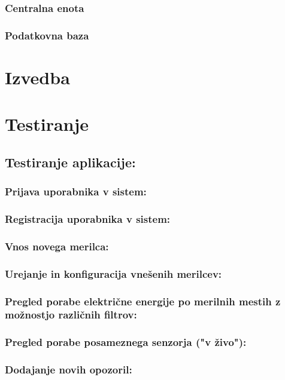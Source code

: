 \documentclass[12pt,a4paper,titlepage,openany]{report}
\begin{document}
\subsection{Centralna enota}

\subsection{Podatkovna baza}

\chapter{Izvedba}
\thispagestyle{fancy}

\chapter{Testiranje}
\thispagestyle{fancy}


\section{Testiranje aplikacije:}
\thispagestyle{fancy}


\subsection{Prijava uporabnika v sistem:}
\subsection{Registracija uporabnika v sistem:}
\subsection{Vnos novega merilca:}
\subsection{Urejanje in konfiguracija vnešenih merilcev:}
\subsection{Pregled porabe električne energije po merilnih mestih z možnostjo različnih filtrov:}
\subsection{Pregled porabe posameznega senzorja ("v živo"):}
\subsection{Dodajanje novih opozoril:}
\end{document}
